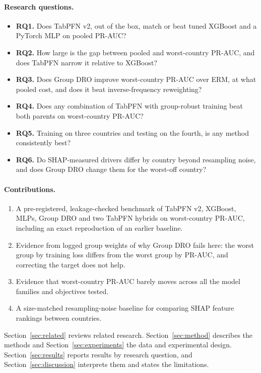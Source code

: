 \documentclass[11pt]{article}
\begin{document}
\paragraph{Research questions.}
\begin{itemize}
  \item \textbf{RQ1.} Does TabPFN v2, out of the box, match or beat tuned XGBoost and a PyTorch MLP on pooled PR-AUC?
  \item \textbf{RQ2.} How large is the gap between pooled and worst-country PR-AUC, and does TabPFN narrow it relative to XGBoost?
  \item \textbf{RQ3.} Does Group DRO improve worst-country PR-AUC over ERM, at what pooled cost, and does it beat inverse-frequency reweighting?
  \item \textbf{RQ4.} Does any combination of TabPFN with group-robust training beat both parents on worst-country PR-AUC?
  \item \textbf{RQ5.} Training on three countries and testing on the fourth, is any method consistently best?
  \item \textbf{RQ6.} Do SHAP-measured drivers differ by country beyond resampling noise, and does Group DRO change them for the worst-off country?
\end{itemize}

\paragraph{Contributions.}
\begin{enumerate}
  \item A pre-registered, leakage-checked benchmark of TabPFN v2, XGBoost, MLPs, Group DRO and two TabPFN hybrids on worst-country PR-AUC, including an exact reproduction of an earlier baseline.
  \item Evidence from logged group weights of why Group DRO fails here: the worst group by training loss differs from the worst group by PR-AUC, and correcting the target does not help.
  \item Evidence that worst-country PR-AUC barely moves across all the model families and objectives tested.
  \item A size-matched resampling-noise baseline for comparing SHAP feature rankings between countries.
\end{enumerate}

Section~\ref{sec:related} reviews related research. Section~\ref{sec:method} describes the methods and Section~\ref{sec:experiments} the data and experimental design. Section~\ref{sec:results} reports results by research question, and Section~\ref{sec:discussion} interprets them and states the limitations.
\end{document}
